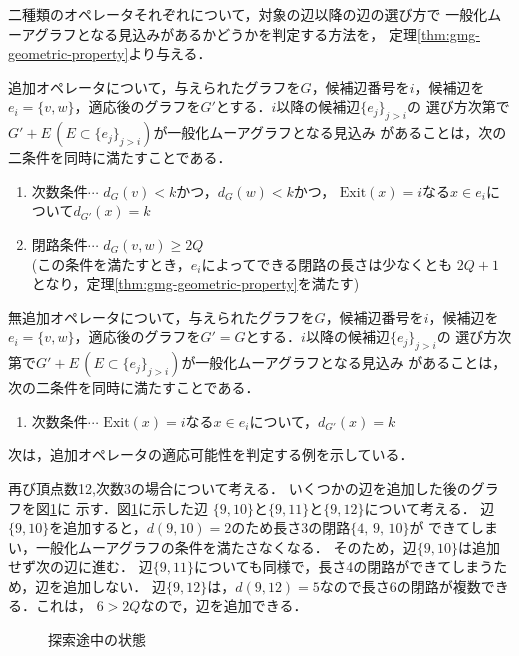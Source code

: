 二種類のオペレータそれぞれについて，対象の辺以降の辺の選び方で
一般化ムーアグラフとなる見込みがあるかどうかを判定する方法を，
定理\ref{thm:gmg-geometric-property}より与える．
\begin{collary-without-proof}
  \label{coll:basic-add-operator}
  追加オペレータについて，与えられたグラフを$G$，候補辺番号を$i$，候補辺を
  $e_i=\{v,w\}$，適応後のグラフを$G'$とする．$i$以降の候補辺$\{e_j\}_{j>i}$の
  選び方次第で$G'+E\,(E\subset \{e_j\}_{j>i})$が一般化ムーアグラフとなる見込み
  があることは，次の二条件を同時に満たすことである．
  \begin{enumerate}
  \item 次数条件$\cdots$ $d_G(v)<k$かつ，$d_G(w)<k$かつ，
    $\text{Exit}(x)=i$なる$x\in e_i$について$d_{G'}(x)=k$
  \item 閉路条件$\cdots$ $d_G(v,w)\geq2Q$\\
    (この条件を満たすとき，$e_i$によってできる閉路の長さは少なくとも
    $2Q+1$となり，定理\ref{thm:gmg-geometric-property}を満たす)
  \end{enumerate}
\end{collary-without-proof}
\begin{collary-without-proof}
  \label{coll:basic-noadd-operator}
  無追加オペレータについて，与えられたグラフを$G$，候補辺番号を$i$，候補辺を
  $e_i=\{v,w\}$，適応後のグラフを$G'=G$とする．$i$以降の候補辺$\{e_j\}_{j>i}$の
  選び方次第で$G'+E\,(E\subset \{e_j\}_{j>i})$が一般化ムーアグラフとなる見込み
  があることは，次の二条件を同時に満たすことである．
  \begin{enumerate}
  \item 次数条件$\cdots$ $\text{Exit}(x)=i$なる$x\in e_i$について，$d_{G'}(x)=k$
  \end{enumerate}
\end{collary-without-proof}
次は，追加オペレータの適応可能性を判定する例を示している．
\begin{example}
  再び頂点数12,次数3の場合について考える．
  いくつかの辺を追加した後のグラフを図\ref{fig:feasible-edges-example2}に
  示す．図\ref{fig:feasible-edges-example2}に示した辺
  $\{9,10\}$と$\{9,11\}$と$\{9,12\}$について考える．
  辺$\{9,10\}$を追加すると，$d(9,10)=2$のため長さ3の閉路$\{4,\,9,\,10\}$が
  できてしまい，一般化ムーアグラフの条件を満たさなくなる．
  そのため，辺$\{9,10\}$は追加せず次の辺に進む．
  辺$\{9,11\}$についても同様で，長さ4の閉路ができてしまうため，辺を追加しない．
  辺$\{9,12\}$は，$d(9,12)=5$なので長さ6の閉路が複数できる．これは，
  $6>2Q$なので，辺を追加できる．
\end{example}
\begin{figure}
  \centering
  \def\svgwidth{.35\textwidth}
  
  \caption{探索途中の状態}
  \label{fig:feasible-edges-example2}
\end{figure}

